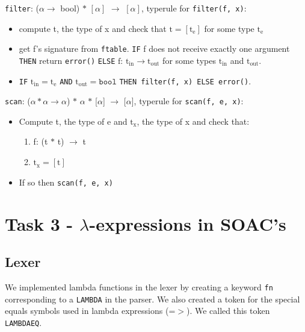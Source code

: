 \documentclass[11pt]{article}
\begin{document}
    \texttt{filter}: ($\alpha \rightarrow$ bool) $\ast$ $[\alpha]$ $\rightarrow$
    $[\alpha]$, typerule for \texttt{filter(f, x)}:
    \vspace{-2.5mm}
    \begin{itemize}[noitemsep]
        \item compute t, the type of x and check that $\text{t} =
            [\text{t}_\text{e}]$ for some type $\text{t}_\text{e}$
        \item get f's signature from \texttt{ftable}. \texttt{IF} f does not
            receive exactly one argument \texttt{THEN} return \texttt{error()}
            \texttt{ELSE} $\text{f: t}_{\text{in}} \rightarrow
            \text{t}_{\text{out}}$ for some types $\text{t}_{\text{in}}$ and
            $\text{t}_{\text{out}}$.
        \item \texttt{IF} $\text{t}_{\text{in}} = \text{t}_\text{e}$
            \texttt{AND} $\text{t}_{\text{out}} = \texttt{bool}$ \texttt{THEN
            filter(f, x) ELSE error()}.
    \end{itemize}

    \texttt{scan}: ($\alpha \ast \alpha \rightarrow \alpha$) $\ast$ $\alpha$
    $\ast$ [$\alpha$] $\rightarrow$ [$\alpha$], typerule for
    \texttt{scan(f, e, x)}:
    \vspace{-2.5mm}
    \begin{itemize}[noitemsep]
        \item Compute t, the type of e and $\text{t}_\text{x}$, the type of x
            and check that:
        	\begin{enumerate}[noitemsep]
        	   \item f: (t $\ast$ t) $\rightarrow$ t
        	   \item $\text{t}_\text{x} = [\text{t}]$
    		\end{enumerate}
        \item If so then \texttt{scan(f, e, x)}
    \end{itemize}

    \section{Task 3 - $\lambda$-expressions in SOAC's}
    \subsection{Lexer}
    We implemented lambda functions in the lexer by creating a keyword
    \texttt{fn} corresponding to a \texttt{LAMBDA} in the parser.  We also
    created a token for the special equals symbols used in lambda expressions
    (=$>$).  We called this token \texttt{LAMBDAEQ}.
\end{document}
